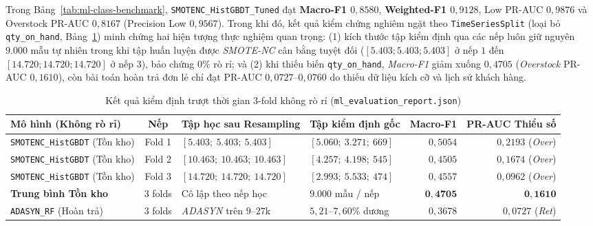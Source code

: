 Trong Bảng~\ref{tab:ml-class-benchmark}, \texttt{SMOTENC_HistGBDT_Tuned} đạt \textbf{Macro-F1 $0{,}8580$}, \textbf{Weighted-F1 $0{,}9128$}, Low PR-AUC $0{,}9876$ và Overstock PR-AUC $0{,}8167$ (Precision Low $0{,}9567$). Trong khi đó, kết quả kiểm chứng nghiêm ngặt theo \texttt{TimeSeriesSplit} (loại bỏ \texttt{qty_on_hand}, Bảng~\ref{tab:ml-strict-tscv}) minh chứng hai hiện tượng thực nghiệm quan trọng: (1) kích thước tập kiểm định qua các nếp luôn giữ nguyên $9.000$ mẫu tự nhiên trong khi tập huấn luyện được \textit{SMOTE-NC} cân bằng tuyệt đối ($[5.403; 5.403; 5.403]$ ở nếp $1$ đến $[14.720; 14.720; 14.720]$ ở nếp $3$), bảo chứng $0\%$ rò rỉ; và (2) khi thiếu biến \texttt{qty_on_hand}, \textit{Macro-F1} giảm xuống $0{,}4705$ (\textit{Overstock} PR-AUC $0{,}1610$), còn bài toán hoàn trả đơn lẻ chỉ đạt PR-AUC $0{,}0727$--$0{,}0760$ do thiếu dữ liệu kích cỡ và lịch sử khách hàng.

\begin{table}[H]
	\centering
	\caption{Kết quả kiểm định trượt thời gian $3$-fold không rò rỉ (\texttt{ml\_evaluation\_report.json})}
	\label{tab:ml-strict-tscv}
	\scriptsize
	\setlength{\tabcolsep}{3.5pt}
	\begin{tabular}{l c p{3.6cm} p{3.2cm} r r}
		\toprule
		\textbf{Mô hình (Không rò rỉ)}                  & \textbf{Nếp} & \textbf{Tập học sau Resampling} & \textbf{Tập kiểm định gốc} & \textbf{Macro-F1}   & \textbf{PR-AUC Thiểu số}   \\
		\midrule
		\texttt{SMOTENC_HistGBDT} (Tồn kho) & Fold 1       & $[5.403;\ 5.403;\ 5.403]$       & $[5.060;\ 3.271;\ 669]$    & $0{,}5054$          & $0{,}2193$ (\textit{Over}) \\
		\texttt{SMOTENC_HistGBDT} (Tồn kho) & Fold 2       & $[10.463;\ 10.463;\ 10.463]$    & $[4.257;\ 4.198;\ 545]$    & $0{,}4505$          & $0{,}1674$ (\textit{Over}) \\
		\texttt{SMOTENC_HistGBDT} (Tồn kho) & Fold 3       & $[14.720;\ 14.720;\ 14.720]$    & $[2.993;\ 5.533;\ 474]$    & $0{,}4557$          & $0{,}0962$ (\textit{Over}) \\
		\textbf{Trung bình Tồn kho}                     & $3$ folds    & Cô lập theo nếp học             & $9.000$ mẫu / nếp          & $\mathbf{0{,}4705}$ & $\mathbf{0{,}1610}$        \\
		\midrule
		\texttt{ADASYN_RF} (Hoàn trả)       & $3$ folds    & \textit{ADASYN} trên $9$--$27$k & $5{,}21$--$7{,}60\%$ dương & $0{,}3678$          & $0{,}0727$ (\textit{Ret})  \\
		\bottomrule
	\end{tabular}
\end{table}

